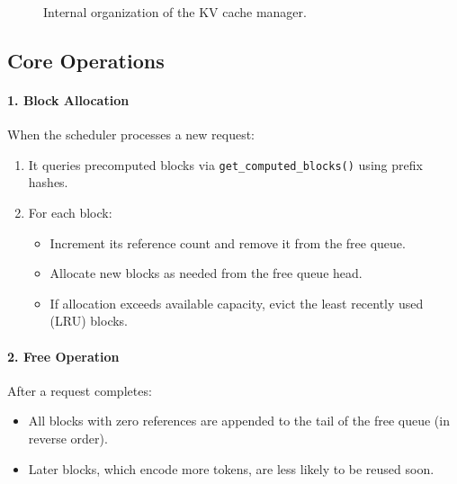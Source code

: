 \begin{figure}[H]
\centering
{}
\caption{Internal organization of the KV cache manager.}
\end{figure}

\subsection{Core Operations}

\paragraph{1. Block Allocation}
When the scheduler processes a new request:
\begin{enumerate}
    \item It queries precomputed blocks via \texttt{get\_computed\_blocks()} using prefix hashes.
    \item For each block:
    \begin{itemize}
        \item Increment its reference count and remove it from the free queue.
        \item Allocate new blocks as needed from the free queue head.
        \item If allocation exceeds available capacity, evict the least recently used (LRU) blocks.
    \end{itemize}
\end{enumerate}

\paragraph{2. Free Operation}
After a request completes:
\begin{itemize}
    \item All blocks with zero references are appended to the tail of the free queue (in reverse order).
    \item Later blocks, which encode more tokens, are less likely to be reused soon.
\end{itemize}

